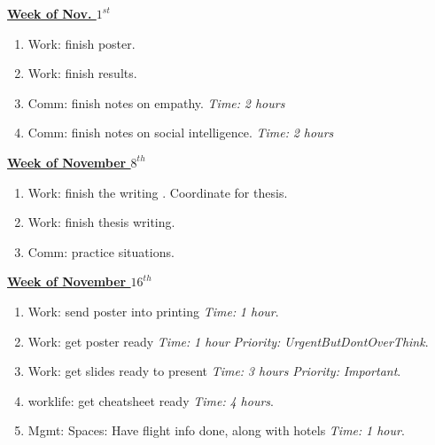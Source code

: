\documentclass[serif, mathserif, final]{beamer}
\newcommand{\timeEst}[1]{\textit{Time:} \textit{#1}}
\newcommand{\priority}[1]{\textit{Priority:} \textit{#1}}
\begin{document}
\begin{frame}{}
\begin{columns}
\begin{column}{0.5\linewidth}
\begin{block}{\small \underline{\textbf{Week of Nov. $1^{st}$}}}
\begin{enumerate}
\tiny \item \tiny Work: finish poster. 
\item \tiny Work: finish results. 
\item \tiny Comm: finish notes on empathy. \timeEst{2 hours} 
\item \tiny Comm: finish notes on social intelligence. \timeEst{2 hours} 
\end{enumerate}
\end{block}

\begin{block}{\small \underline{\textbf{Week of November $8^{th}$}}}
\begin{enumerate}
\tiny \item \tiny Work: finish the writing . Coordinate for thesis. 
\item \tiny  Work: finish thesis writing. 
\item \tiny  Comm: practice situations.
\end{enumerate}
\end{block}

\begin{block} {\small \underline{\textbf{Week of November $16^{th}$}} }
\begin{enumerate}
\tiny \item \tiny Work: send poster into printing \timeEst{1 hour}. 
\item \tiny Work: get poster ready \timeEst{1 hour} \priority{UrgentButDontOverThink}. 
\item \tiny Work: get slides ready to present \timeEst{3 hours} \priority{Important}. 
\item \tiny worklife: get cheatsheet ready \timeEst{4 hours}. 
\item \tiny Mgmt: Spaces: Have flight info done, along with hotels \timeEst{1 hour}. 
\end{enumerate}
\end{block} 
\end{column}%


\end{columns}
\end{frame}
\end{document}

